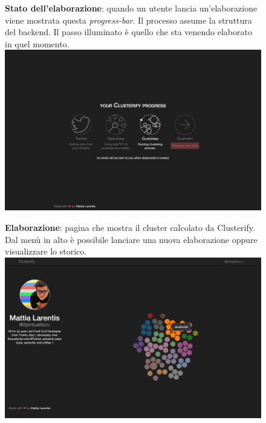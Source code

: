         	\begin{figure}[p]
		\textbf{Stato dell'elaborazione}: quando un utente lancia un'elaborazione viene mostrata questa \emph{progress-bar}. Il processo assume la struttura del backend. Il passo illuminato è quello che sta venendo elaborato in quel momento.\\

        		\includegraphics[width=\textwidth]{img/clusterify/process.png}
        	\end{figure}
        
        	\begin{figure}[p]
		\textbf{Elaborazione}: pagina che mostra il cluster calcolato da Clusterify. Dal menù in alto è possibile lanciare una nuova elaborazione oppure visualizzare lo storico.\\

        		\includegraphics[width=\textwidth]{img/clusterify/elaboration.png}
        	\end{figure}
        
